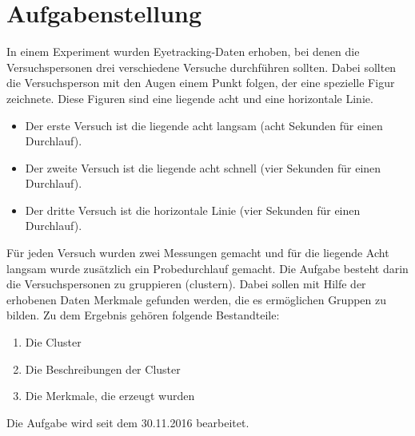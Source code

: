 \chapter{Aufgabenstellung}

In einem Experiment wurden Eyetracking-Daten erhoben, bei denen die Versuchspersonen drei verschiedene Versuche durchf\"uhren sollten. Dabei sollten die Versuchsperson mit den Augen einem Punkt folgen, der eine spezielle Figur zeichnete. Diese Figuren sind eine liegende acht und eine horizontale Linie.

\begin{itemize}
	\item Der erste Versuch ist die liegende acht langsam (acht Sekunden f\"ur einen Durchlauf).
	\item Der zweite Versuch ist die liegende acht schnell (vier Sekunden f\"ur einen Durchlauf).
	\item Der dritte Versuch ist die horizontale Linie (vier Sekunden f\"ur einen Durchlauf).
\end{itemize}

F\"ur jeden Versuch wurden zwei Messungen gemacht und f\"ur die liegende Acht langsam wurde zus\"atzlich ein Probedurchlauf gemacht.
Die Aufgabe besteht darin die Versuchspersonen zu gruppieren (clustern). Dabei sollen mit Hilfe der erhobenen Daten Merkmale gefunden werden, die es erm\"oglichen Gruppen zu bilden.
Zu dem Ergebnis geh\"oren folgende Bestandteile:

\begin{enumerate}
	\item Die Cluster
	\item Die Beschreibungen der Cluster
	\item Die Merkmale, die erzeugt wurden
\end{enumerate}

Die Aufgabe wird seit dem 30.11.2016 bearbeitet.